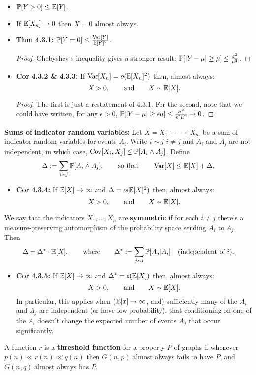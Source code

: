 \documentclass[11pt]{article}
\newenvironment{INT}[1][]{\begin{itemize}\small\item\textbf{#1}}{\end{itemize}}
\newcommand{\moreINT}[1][]{\item\textbf{#1}}
\begin{document}
\begin{chapter4}
\begin{itemise}
\begin{INT}
$\operatorname{\mathbb{P}}[Y>0]\leq\operatorname{\mathbb{E}}[Y]$.
\moreINT If $\operatorname{\mathbb{E}}[X_n]\rightarrow0$ then $X=0$ almost always.
\moreINT[Thm 4.3.1:] $\operatorname{\mathbb{P}}[Y=0]\leq\frac{\operatorname{Var}[Y]}{\operatorname{\mathbb{E}}[Y]^2}$.
\begin{proof}
Chebyshev's inequality gives a stronger result:
$\operatorname{\mathbb{P}}[|Y-\mu|\geq\mu]\leq\frac{\sigma^2}{\mu^2}$.
\end{proof}
\moreINT[Cor 4.3.2 \& 4.3.3:] If $\operatorname{Var}[X_n]=o(\operatorname{\mathbb{E}}[X_n]^2)$ then, almost always:
\[X>0,\textup{\qquad and\qquad}X\sim \operatorname{\mathbb{E}}[X].\]
\begin{proof}
The first is just a restatement of 4.3.1. For the second, note that we could have written, for any $\epsilon>0$, 
$\operatorname{\mathbb{P}}[|Y-\mu|\geq\epsilon\mu]\leq\frac{\sigma^2}{\epsilon^2\mu^2}\rightarrow0$.
\end{proof}
\end{INT}
\item \textbf{Sums of indicator random variables:} Let $X=X_1+\cdots+X_m$ be a sum of indicator random variables for events $A_i$. Write $i\sim j$ \Iff $i\neq j$ and $A_i$ and $A_j$ are not independent, in which case, $\operatorname{Cov}[X_i,X_j]\leq\operatorname{\mathbb{P}}[A_i\wedge A_j]$. Define
\[\Delta:=\sum_{i\sim j}\operatorname{\mathbb{P}}[A_i\wedge A_j],\textup{\qquad so that\qquad}\operatorname{Var}[X]\leq\operatorname{\mathbb{E}}[X]+\Delta.\]
\begin{INT}[Cor 4.3.4:]
If $\operatorname{\mathbb{E}}[X]\rightarrow\infty$ and $\Delta=o(\operatorname{\mathbb{E}}[X]^2)$ then, almost always:
\[X>0,\textup{\qquad and\qquad}X\sim \operatorname{\mathbb{E}}[X].\]
\end{INT}
We say that the indicators $X_1,\ldots,X_n$ are \textbf{symmetric} if for each $i\neq j$ there's a measure-preserving automorphism of the probability space sending $A_i$ to $A_j$. Then
\[\Delta=\Delta^*\cdot\operatorname{\mathbb{E}}[X],\textup{\qquad where\qquad}\Delta^*:=\sum_{j\sim i}\operatorname{\mathbb{P}}[A_j|A_i]\textup{\quad(independent of $i$)}.\]
\begin{INT}[Cor 4.3.5:]
If $\operatorname{\mathbb{E}}[X]\rightarrow\infty$ and $\Delta^*=o(\operatorname{\mathbb{E}}[X])$ then, almost always:
\[X>0,\textup{\qquad and\qquad}X\sim \operatorname{\mathbb{E}}[X].\]
In particular, this applies when ($\operatorname{\mathbb{E}}[x]\rightarrow\infty$, and) sufficiently many of the $A_i$ and $A_j$ are independent (or have low probability), that conditioning on one of the $A_i$ doesn't change the expected number of events $A_j$ that occur significantly.
\end{INT}
\item %
A function $r$ is a \textbf{threshold function} for a property $P$ of graphs if whenever $p(n)\ll r(n)\ll q(n)$ then $G(n,p)$ almost always fails to have $P$, and $G(n,q)$ almost always has $P$.


\end{itemise}
\end{chapter4}
\end{document}
